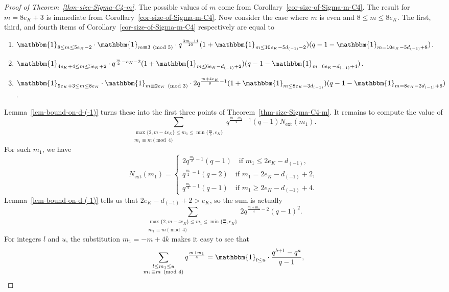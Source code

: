 \documentclass[11pt]{amsart}
\theoremstyle{theorem}
\theoremstyle{example}
\theoremstyle{definition}
\numberwithin{theorem}{section}
\numberwithin{theorem}{section}
\newcommand{\ext}{\mathrm{ext}}
\begin{document}
\begin{proof}[Proof of Theorem~\ref{thm-size-Sigma-C4-m}]
    The possible values of $m$ come from Corollary~\ref{cor-size-of-Sigma-m-C4}. The result for $m= 8e_K + 3$ is immediate from Corollary~\ref{cor-size-of-Sigma-m-C4}. Now consider the case where $m$ is even and $8 \leq m \leq 8e_K$. The first, third, and fourth items of Corollary~\ref{cor-size-of-Sigma-m-C4} respectively are equal to 
    \begin{enumerate}
    \item $\mathbbm{1}_{8\leq m \leq 5e_K - 2}\cdot \mathbbm{1}_{m\equiv 3\pmod{5}}\cdot q^{\frac{3m-14}{10}}(1 + \mathbbm{1}_{m \leq 10e_K - 5d_{(-1)} - 2})(q - 1 - \mathbbm{1}_{m = 10e_K - 5d_{(-1)} + 8})$.
        \item $\mathbbm{1}_{4e_K + 4 \leq m \leq 5e_K + 2}\cdot q^{\frac{m}{2}-e_K - 2}(1 + \mathbbm{1}_{m \leq 6e_K - d_{(-1)} + 2})(q - 1 - \mathbbm{1}_{m = 6e_K - d_{(-1)} + 4})$.
        \item $\mathbbm{1}_{5e_K + 3 \leq m \leq 8e_K}\cdot \mathbbm{1}_{m\equiv 2e_K\pmod{3}}\cdot 2q^{\frac{m+4e_K}{6} - 1}(1 + \mathbbm{1}_{m \leq 8e_K - 3d_{(-1)}})(q - 1 - \mathbbm{1}_{m = 8e_K - 3d_{(-1)} + 6})$. 
    \end{enumerate}
    Lemma~\ref{lem-bound-on-d-(-1)} turns these into the first three points of Theorem~\ref{thm-size-Sigma-C4-m}. It remains to compute the value of 
    $$
    \sum_{\substack{\max\{2, m - 4e_K\} \leq m_1 \leq \min\{\frac{m}{5}, e_K\} \\ m_1 \equiv m \pmod{4}}} q^{\frac{m-m_1}{4} - 1}(q-1)N_{\ext}(m_1).
    $$
    For such $m_1$, we have
    $$
    N_{\ext}(m_1) = \begin{cases}
        2q^{\frac{m_1}{2} - 1}(q-1) \quad\text{if $m_1 \leq 2e_K - d_{(-1)}$},
        \\
        q^{\frac{m_1}{2} - 1}(q-2)\quad\text{if $m_1 = 2e_K - d_{(-1)} + 2$},
        \\
        q^{\frac{m_1}{2} - 1}(q-1) \quad\text{if $m_1 \geq 2e_K - d_{(-1)} + 4$}.
    \end{cases}
    $$
    Lemma~\ref{lem-bound-on-d-(-1)} tells us that $2e_K - d_{(-1)} + 2 > e_K$, so the sum is actually 
    $$
    \sum_{\substack{\max\{2, m - 4e_K\} \leq m_1 \leq \min\{\frac{m}{5}, e_K
     \} \\ m_1 \equiv m \pmod{4}}} 2 q^{\frac{m + m_1}{4} - 2}(q-1)^2.
    $$
    For integers $l$ and $u$, the substitution $m_1 = -m + 4k$ makes it easy to see that
    $$
    \sum_{\substack{l \leq m_1 \leq u \\ m_1 \equiv m\pmod{4}}} q^{\frac{m + m_1}{4}} = \mathbbm{1}_{l \leq u}\cdot \frac{q^{b + 1} - q^a}{q-1},
$$
\end{proof}
\end{document}
